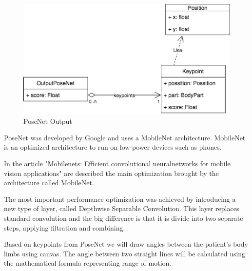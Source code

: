  \begin{figure}[htbp]
	\centerline{\includegraphics[scale=0.7]{fig/uml-posenet.png}}  
	\caption{PoseNet Output}
	\label{fig:uml-posenet}
\end{figure}

PoseNet was developed by Google and uses a MobileNet architecture.
MobileNet is an optimized architecture to run on low-power devices such as phones.

In the article "Mobilenets: Efficient convolutional neuralnetworks for mobile vision applications"  \cite{DBLP:journals/corr/HowardZCKWWAA17} are described the main optimization brought by the architecture called MobileNet.

The most important performance optimization was achieved by introducing a new type of layer, called Depthwise Separable Convolution. This layer replaces standard convolution and the big difference is that it is divide into two separate steps, applying filtration and combining.

Based on keypoints from PoseNet we will draw angles between the patient's body limbs using canvas.
The angle between two straight lines will be calculated using the mathematical formula representing range of motion.

